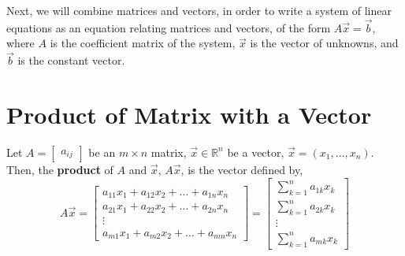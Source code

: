\documentclass[letterpaper,12pt]{article}
\begin{document}
Next, we will combine matrices and vectors, in order to write a system of linear equations as an equation relating matrices and vectors, of the form $A\vec{x} = \vec{b}$, where $A$ is the coefficient matrix of the system, $\vec{x}$ is the vector of unknowns, and $\vec{b}$ is the constant vector.

\section*{Product of Matrix with a Vector}
\begin{definition}
Let $A = \begin{bmatrix} a_{ij} \end{bmatrix}$ be an $m \times n$ matrix, $\vec{x} \in \mathbb{R}^n$ be a vector, $\vec{x} = (x_1, \dots, x_n)$. Then, the \textbf{product} of $A$ and $\vec{x}$, $A\vec{x}$, is the vector defined by,
\begin{equation*}
    \boxed{A\vec{x} = \begin{bmatrix} a_{11} x_1 + a_{12} x_2 + \dots + a_{1n} x_n \\ a_{21} x_1 + a_{22} x_2 + \dots + a_{2n} x_n \\ \vdots \\ a_{m1} x_1 + a_{m2} x_2 + \dots + a_{mn} x_n \end{bmatrix} = \begin{bmatrix} \sum_{k=1}^n a_{1k} x_k \\ \sum_{k=1}^n a_{2k} x_k \\ \vdots \\ \sum_{k=1}^n a_{mk} x_k \end{bmatrix}}
\end{equation*}
\end{definition}
\end{document}
